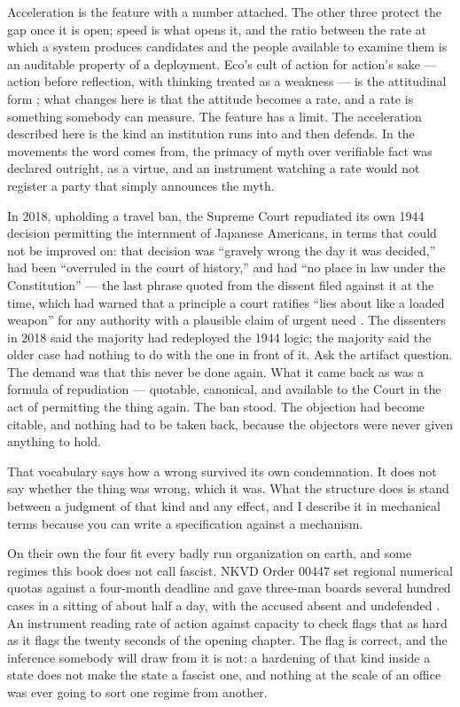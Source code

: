 Acceleration is the feature with a number attached. The other three protect the gap once it is open; speed is what opens it, and the ratio between the rate at which a system produces candidates and the people available to examine them is an auditable property of a deployment. Eco's cult of action for action's sake — action before reflection, with thinking treated as a weakness — is the attitudinal form \autocite{eco1995urfascism}; what changes here is that the attitude becomes a rate, and a rate is something somebody can measure. The feature has a limit. The acceleration described here is the kind an institution runs into and then defends. In the movements the word comes from, the primacy of myth over verifiable fact was declared outright, as a virtue, and an instrument watching a rate would not register a party that simply announces the myth.

In 2018, upholding a travel ban, the Supreme Court repudiated its own 1944 decision permitting the internment of Japanese Americans, in terms that could not be improved on: that decision was “gravely wrong the day it was decided,” had been “overruled in the court of history,” and had “no place in law under the Constitution” — the last phrase quoted from the dissent filed against it at the time, which had warned that a principle a court ratifies “lies about like a loaded weapon” for any authority with a plausible claim of urgent need \autocite{trump2018hawaii,korematsu1944}. The dissenters in 2018 said the majority had redeployed the 1944 logic; the majority said the older case had nothing to do with the one in front of it. Ask the artifact question. The demand was that this never be done again. What it came back as was a formula of repudiation — quotable, canonical, and available to the Court in the act of permitting the thing again. The ban stood. The objection had become citable, and nothing had to be taken back, because the objectors were never given anything to hold.

That vocabulary says how a wrong survived its own condemnation. It does not say whether the thing was wrong, which it was. What the structure does is stand between a judgment of that kind and any effect, and I describe it in mechanical terms because you can write a specification against a mechanism.

On their own the four fit every badly run organization on earth, and some regimes this book does not call fascist. NKVD Order 00447 set regional numerical quotas against a four-month deadline and gave three-man boards several hundred cases in a sitting of about half a day, with the accused absent and undefended \autocite{werth2010nkvd00447}. An instrument reading rate of action against capacity to check flags that as hard as it flags the twenty seconds of the opening chapter. The flag is correct, and the inference somebody will draw from it is not: a hardening of that kind inside a state does not make the state a fascist one, and nothing at the scale of an office was ever going to sort one regime from another.


